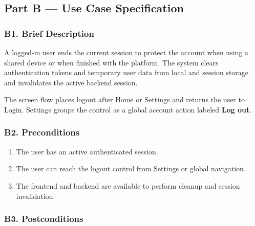 \documentclass[12pt]{article}
\begin{document}
\hypertarget{sec:part-b-use-case-specification}{}
\subsection*{Part B --- Use Case Specification}
\par\medskip

\hypertarget{sec:b1-brief-description}{}
\subsubsection*{B1. Brief Description}
\par\medskip

A logged-in user ends the current session to protect the account when using a shared device or when finished with the platform. The system clears authentication tokens and temporary user data from local and session storage and invalidates the active backend session.
\par\medskip

The screen flow places logout after Home or Settings and returns the user to Login. Settings groups the control as a global account action labeled \textbf{Log out}.
\par\medskip

\hypertarget{sec:b2-preconditions}{}
\subsubsection*{B2. Preconditions}
\par\medskip

\begin{enumerate}
\item The user has an active authenticated session.
\item The user can reach the logout control from Settings or global navigation.
\item The frontend and backend are available to perform cleanup and session invalidation.
\end{enumerate}
\par\medskip

\hypertarget{sec:b3-postconditions}{}
\subsubsection*{B3. Postconditions}
\par\medskip
\end{document}
